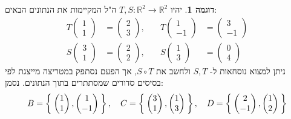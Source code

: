 \documentclass[12pt]{report}
\theoremstyle{plain}
\theoremstyle{definition}
\newtheorem{example}{דוגמה}[chapter]
\newcommand{\R}{\mathbb{R}}
\newcommand{\0}{\mathbf{0}}
\begin{document}
\begin{example}
יהיו
$T,S:\R^2\to\R^2$
ה"ל המקיימות את הנתונים הבאים:
$$
\begin{alignedat}{2}
T\begin{pmatrix}1\\1\end{pmatrix}  &= \begin{pmatrix}2\\3\end{pmatrix},\quad &
T\begin{pmatrix}1\\-1\end{pmatrix} &= \begin{pmatrix}3\\-1\end{pmatrix} \\
S\begin{pmatrix}3\\1\end{pmatrix}  &= \begin{pmatrix}2\\2\end{pmatrix},\quad &
S\begin{pmatrix}1\\3\end{pmatrix} &= \begin{pmatrix}0\\4\end{pmatrix}
\end{alignedat}
$$
ניתן למצוא נוסחאות ל-
$S,T$
ולחשב את
$S\circ T$,
אך הפעם נסתפק במטריצה מייצגת לפי בסיסים סדורים שמסתתרים בתוך הנתונים. נסמן:
$$
B=\Set{\begin{pmatrix}1\\1\end{pmatrix},\begin{pmatrix}1\\-1\end{pmatrix}},\quad C=\Set{\begin{pmatrix}3\\1\end{pmatrix},\begin{pmatrix}1\\3\end{pmatrix}}, \quad D=\Set{\begin{pmatrix}2\\-1\end{pmatrix},\begin{pmatrix}1\\2\end{pmatrix}}
$$
\end{example}
\end{document}
